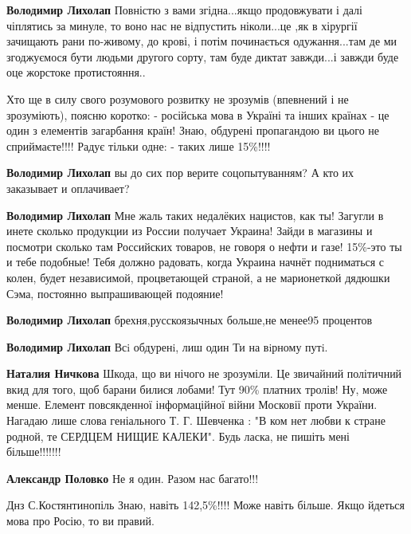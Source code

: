 \begin{itemize}
\begin{itemize}
\textbf{Володимир Лихолап} Повністю з вами згідна...якщо продовжувати і далі
чіплятись за минуле, то воно нас не відпустить ніколи...це ,як в
хірургії зачищають рани по-живому, до крові, і потім починається
одужання...там де ми згоджуємося бути людьми другого сорту, там буде диктат
завжди...і завжди буде оце жорстоке протистояння..
\end{itemize}


Хто ще в силу свого розумового розвитку не зрозумів (впевнений і не
зрозуміють), поясню коротко: - російська мова в Україні та інших країнах - це
один з елементів загарбання країн! Знаю, обдурені пропагандою ви цього не
сприймаєте!!!! Радує тільки одне: - таких лише 15\%!!!!

\begin{itemize}

\textbf{Володимир Лихолап} вы до сих пор верите соцопытуванням? А кто их заказывает и оплачивает?


\textbf{Володимир Лихолап} Мне жаль таких недалёких нацистов, как ты! Загугли в
инете сколько продукции из России получает Украина! Зайди в магазины и посмотри
сколько там Российских товаров, не говоря о нефти и газе! 15\%-это ты и тебе
подобные! Тебя должно радовать, когда Украина начнёт подниматься с колен, будет
независимой, процветающей страной, а не марионеткой дядюшки Сэма, постоянно
выпрашивающей подояние!

\textbf{Володимир Лихолап} брехня,русскоязычных больше,не менее95 процентов

\textbf{Володимир Лихолап} Всi обдуренi, лиш один Ти на вiрному путi.

\textbf{Наталия Ничкова} Шкода, що ви нічого не зрозуміли. Це звичайний політичний вкид
для того, щоб барани билися лобами! Тут 90\% платних тролів! Ну, може менше.
Елемент повсякденної інформаційної війни Московії проти України. Нагадаю лише
слова геніального Т. Г. Шевченка : "В ком нет любви к стране родной, те СЕРДЦЕМ
НИЩИЕ КАЛЕКИ". Будь ласка, не пишіть мені більше!!!!!!!

\textbf{Александр Половко} Не я один. Разом нас багато!!!


Днз С.Костянтинопіль Знаю, навіть 142,5\%!!!! Може навіть більше. Якщо йдеться мова про Росію, то ви правий.


\end{itemize}
\end{itemize}
